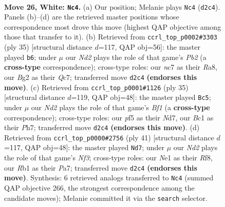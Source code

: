 \documentclass[11pt]{article}
\begin{document}
\clearpage

\begin{figure}[p]\centering
\begin{subfigure}{0.46\textwidth}\centering
\resizebox{\linewidth}{!}{%
\newchessgame
\chessboard[
  setfen={1rbq2k1/p1n2rn1/5bpp/2pp1p2/P4P2/1P4P1/Q2NP1BP/1RBRN1K1 w - - 8 26},
  showmover=false,
  pgfstyle=straightmove, color=movearrow, markmove={d2-c4}
]}
\caption{}
\end{subfigure}\hfill
\begin{subfigure}{0.46\textwidth}\centering
\resizebox{\linewidth}{!}{%
\newchessgame
\chessboard[
  setfen={r3r1k1/1pqbp1bp/2n3p1/p1p2p2/2P2P2/3PQNP1/PP1B1RBP/1R4K1 b - - 0 18},
  showmover=false,
  pgfstyle=straightmove, color=movearrow, markmove={b7-b6}
]}
\caption{}
\end{subfigure}
\\[4pt]
\begin{subfigure}{0.46\textwidth}\centering
\resizebox{\linewidth}{!}{%
\newchessgame
\chessboard[
  setfen={2r1kb1r/1q1n1ppp/p3p3/3n4/1p1B1PPP/8/PPPQN3/2KR1B1R b k - 0 18},
  showmover=false,
  pgfstyle=straightmove, color=movearrow, markmove={f8-c5}
]}
\caption{}
\end{subfigure}\hfill
\begin{subfigure}{0.46\textwidth}\centering
\resizebox{\linewidth}{!}{%
\newchessgame
\chessboard[
  setfen={4rr1k/p1q1bbpp/2pp1n2/4p3/2P3P1/PP3N1P/5PB1/R1BQR1K1 b - - 2 21},
  showmover=false,
  pgfstyle=straightmove, color=movearrow, markmove={f6-d7}
]}
\caption{}
\end{subfigure}
\caption{\textbf{Move 26, White: \texttt{Nc4}.} (a) Our position; Melanie plays \texttt{Nc4} (\texttt{d2c4}). Panels (b)--(d) are the retrieved master positions whose correspondence most drove this move (highest QAP objective among those that transfer to it). (b) Retrieved from \texttt{ccrl\_top\_p0002\#3303} (ply 35) [structural distance $d$=117, QAP obj=56]: the master played \texttt{b6}; under $\mu$ our \emph{Nd2} plays the role of that game's \emph{Pb2} (a \textbf{cross-type} correspondence); cross-type roles: our \emph{n}c7 as their \emph{R}a8, our \emph{B}g2 as their \emph{Q}c7; transferred move \texttt{d2c4} \textbf{(endorses this move)}. (c) Retrieved from \texttt{ccrl\_top\_p0001\#1126} (ply 35) [structural distance $d$=119, QAP obj=48]: the master played \texttt{Bc5}; under $\mu$ our \emph{Nd2} plays the role of that game's \emph{Bf1} (a \textbf{cross-type} correspondence); cross-type roles: our \emph{p}f5 as their \emph{N}d7, our \emph{B}c1 as their \emph{P}h7; transferred move \texttt{d2c4} \textbf{(endorses this move)}. (d) Retrieved from \texttt{ccrl\_top\_p0000\#2756} (ply 41) [structural distance $d$=117, QAP obj=48]: the master played \texttt{Nd7}; under $\mu$ our \emph{Nd2} plays the role of that game's \emph{Nf3}; cross-type roles: our \emph{N}e1 as their \emph{R}f8, our \emph{R}b1 as their \emph{P}a7; transferred move \texttt{d2c4} \textbf{(endorses this move)}. Synthesis: 6 retrieved analogs transferred to \texttt{Nc4} (summed QAP objective 266, the strongest correspondence among the candidate moves); Melanie committed it via the \texttt{search} selector.}
\label{fig:thought-m50}
\end{figure}
\end{document}
